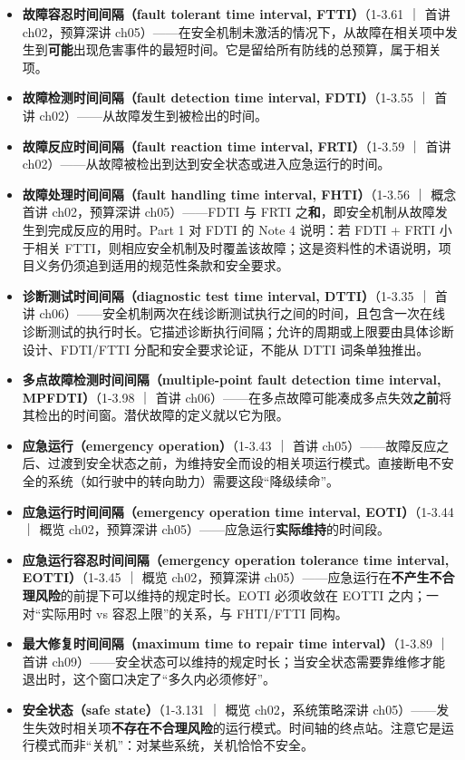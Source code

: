 \begin{itemize}
\item \textbf{故障容忍时间间隔（fault tolerant time interval, FTTI）}（1-3.61 ｜ 首讲 ch02，预算深讲 ch05）——在安全机制未激活的情况下，从故障在相关项中发生到\textbf{可能}出现危害事件的最短时间。它是留给所有防线的总预算，属于相关项。
\item \textbf{故障检测时间间隔（fault detection time interval, FDTI）}（1-3.55 ｜ 首讲 ch02）——从故障发生到被检出的时间。
\item \textbf{故障反应时间间隔（fault reaction time interval, FRTI）}（1-3.59 ｜ 首讲 ch02）——从故障被检出到达到安全状态或进入应急运行的时间。
\item \textbf{故障处理时间间隔（fault handling time interval, FHTI）}（1-3.56 ｜ 概念首讲 ch02，预算深讲 ch05）——FDTI 与 FRTI 之\textbf{和}，即安全机制从故障发生到完成反应的用时。Part 1 对 FDTI 的 Note 4 说明：若 FDTI + FRTI 小于相关 FTTI，则相应安全机制及时覆盖该故障；这是资料性的术语说明，项目义务仍须追到适用的规范性条款和安全要求。
\item \textbf{诊断测试时间间隔（diagnostic test time interval, DTTI）}（1-3.35 ｜ 首讲 ch06）——安全机制两次在线诊断测试执行之间的时间，且包含一次在线诊断测试的执行时长。它描述诊断执行间隔；允许的周期或上限要由具体诊断设计、FDTI/FTTI 分配和安全要求论证，不能从 DTTI 词条单独推出。
\item \textbf{多点故障检测时间间隔（multiple-point fault detection time interval, MPFDTI）}（1-3.98 ｜ 首讲 ch06）——在多点故障可能凑成多点失效\textbf{之前}将其检出的时间窗。潜伏故障的定义就以它为限。
\item \textbf{应急运行（emergency operation）}（1-3.43 ｜ 首讲 ch05）——故障反应之后、过渡到安全状态之前，为维持安全而设的相关项运行模式。直接断电不安全的系统（如行驶中的转向助力）需要这段“降级续命”。
\item \textbf{应急运行时间间隔（emergency operation time interval, EOTI）}（1-3.44 ｜ 概览 ch02，预算深讲 ch05）——应急运行\textbf{实际维持}的时间段。
\item \textbf{应急运行容忍时间间隔（emergency operation tolerance time interval, EOTTI）}（1-3.45 ｜ 概览 ch02，预算深讲 ch05）——应急运行在\textbf{不产生不合理风险}的前提下可以维持的规定时长。EOTI 必须收敛在 EOTTI 之内；一对“实际用时 vs 容忍上限”的关系，与 FHTI/FTTI 同构。
\item \textbf{最大修复时间间隔（maximum time to repair time interval）}（1-3.89 ｜ 首讲 ch09）——安全状态可以维持的规定时长；当安全状态需要靠维修才能退出时，这个窗口决定了“多久内必须修好”。
\item \textbf{安全状态（safe state）}（1-3.131 ｜ 概览 ch02，系统策略深讲 ch05）——发生失效时相关项\textbf{不存在不合理风险}的运行模式。时间轴的终点站。注意它是运行模式而非“关机”：对某些系统，关机恰恰不安全。

\end{itemize}
